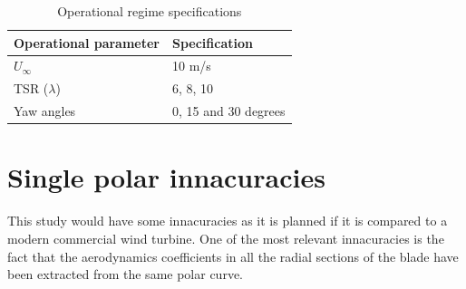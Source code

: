 \begin{table}[htbp]
\centering
\caption{Operational regime specifications}
\begin{tabular}{|l|l|} 
\hline
\textbf{Operational parameter} & \textbf{Specification}  \\ 
\hline
$U_{\infty}$                    & 10 m/s                  \\ 
\hline
TSR  ($\lambda$)                   & 6, 8, 10               \\ 
\hline
Yaw angles                     & 0, 15 and 30 degrees    \\
\hline
\end{tabular}
\label{Op_specs}
\end{table}


\section{Single polar innacuracies}

This study would have some innacuracies as it is planned if it is compared to a modern commercial wind turbine. One of the most relevant innacuracies is the fact that the aerodynamics coefficients in all the radial sections of the blade have been extracted from the same polar curve. \\

